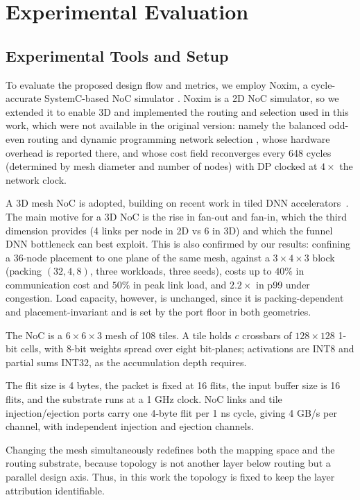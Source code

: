 \section{Experimental Evaluation}
\label{sec:results}
\subsection{Experimental Tools and Setup}
\label{sec:setup}
To evaluate the proposed design flow and metrics, we employ Noxim, a cycle-accurate SystemC-based NoC simulator \cite{cataniaCycleAccurateNetworkChip2016}. Noxim is a 2D NoC simulator, so we extended it to enable 3D and implemented the routing and selection used in this work, which were not available in the original version: namely the balanced odd-even routing \cite{dahirHighlyAdaptiveDeadlockFree2013} and dynamic programming network selection \cite{makDPnetworkOptimalDynamic2009}, whose hardware overhead is reported there, and whose cost field reconverges every 648 cycles (determined by mesh diameter and number of nodes) with DP clocked at $4\times$ the network clock.


A 3D mesh NoC is adopted, building on recent work in tiled DNN accelerators~\cite{liTTNNMThermalTrafficAware2024,narangTEFLONThermallyEfficient2024}. The main motive for a 3D NoC is the rise in fan-out and fan-in, which the
third dimension provides (4 links per node in 2D vs 6 in 3D) and which the funnel DNN bottleneck can best exploit. This is also confirmed by our results: confining a 36-node placement to one
plane of the same mesh, against a $3\times4\times3$ block (packing $(32,4,8)$,
three workloads, three seeds), costs up to $40\%$ in communication cost and
$50\%$ in peak link load, and $2.2\times$ in p99 under congestion. Load
capacity, however, is unchanged, since it is packing-dependent and
placement-invariant and is set by the port floor in both geometries.


The NoC is a $6\times6\times3$ mesh of 108 tiles. A tile holds $c$ crossbars of $128\times128$ 1-bit cells, with 8-bit weights spread over eight bit-planes; activations are INT8 and partial sums
INT32, as the accumulation depth requires. 

The flit size is 4 bytes, the packet is fixed at 16 flits, the input buffer size is 16 flits, and the substrate runs at a 1 GHz clock. NoC links and tile injection/ejection ports carry one 4-byte flit per 1 ns cycle, giving 4 GB/s per channel, with independent injection and ejection channels. 

Changing the mesh simultaneously redefines both the mapping space and the routing substrate, because topology is not another layer below routing but a parallel design axis. Thus, in this work the topology is fixed to keep the layer attribution identifiable.
